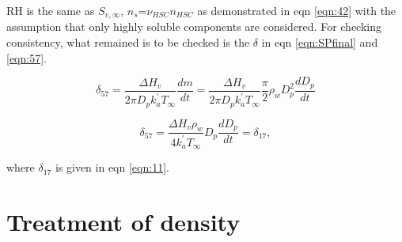 \documentclass[12pt]{amsart}
\begin{document}
RH is the same as $S_{v, \infty}$, $n_{s}$=$\nu_{HSC}$$n_{HSC}$ as demonstrated in eqn \ref{eqn:42} with the assumption that only highly soluble components are considered. For checking consistency, what remained is to be checked is the $\delta$ in eqn \ref{eqn:SPfinal} and \ref{eqn:57}. 


\begin{equation}
\delta_{57}=\frac{\Delta H_{v}}{2 \pi D_{p} k^{'}_{a} T_{\infty}} \frac{dm}{dt}
=\frac{\Delta H_{v}}{2 \pi D_{p} k^{'}_{a} T_{\infty}} \frac{\pi}{2}\rho_wD_{p}^{2}\frac{dD_{p}}{dt}
\end{equation}


\begin{equation}
\delta_{57}=\frac{\Delta H_{v} \rho_{w}}{4 k^{'}_{a} T_{\infty}} D_{p}\frac{dD_{p}}{dt}=\delta_{17},
\end{equation}

where $\delta_{17}$ is given in eqn \ref{eqn:11}.

\section{Treatment of density}
\end{document}
